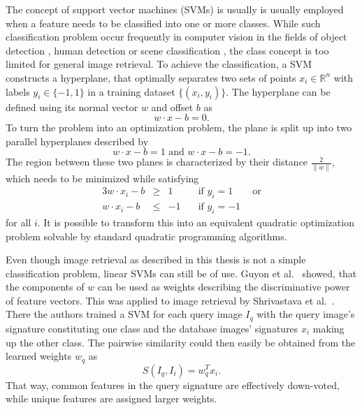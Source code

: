 The concept of support vector machines (SVMs) is usually is usually employed
when a feature needs to be classified into one or more classes. While such
classification problem occur frequently in computer vision in the fields of
object detection \autocite{pontil_support_1998} \autocite{csurka_visual_2004},
human detection \autocite{dalal_histograms_2005} or scene classification
\autocite{yang_evaluating_2007}, the class concept is too limited for general
image retrieval. To achieve the classification, a SVM constructs a hyperplane,
that optimally separates two sets of points $x_i \in \mathbb{R}^n$ with labels
$y_i \in \{-1, 1 \}$ in a training dataset $\{ (x_i, y_i) \}$. The hyperplane
can be defined using its normal vector $w$ and offset $b$ as
\begin{equation*}
    w \cdot x - b = 0.
\end{equation*}
To turn the problem into an optimization problem, the plane is split up into
two parallel hyperplanes described by
\begin{equation*}
    w \cdot x - b = 1 \text{ and } w \cdot x - b = -1.
\end{equation*}
The region between these two planes is characterized by their distance
$\frac{2}{\| w \|}$, which needs to be minimized while satisfying
\begin{alignat*}{3}
    w \cdot x_i - b & \geq & 1 & \quad \text{if } y_i = 1 \qquad \text{or} \\
    w \cdot x_i - b & \leq & -1 & \quad \text{if } y_i = -1
\end{alignat*}
for all $i$. It is possible to transform this into an equivalent quadratic
optimization problem solvable by standard quadratic programming algorithms.

Even though image retrieval as described in this thesis is not a simple
classification problem, linear SVMs can still be of use. Guyon et al.\
\autocite{guyon_gene_2002} showed, that the components of $w$ can be used as
weights describing the discriminative power of feature vectors. This was
applied to image retrieval by Shrivastava et al.\ 
\autocite{shrivastava_data-driven_2011}. There the authors trained a SVM for
each query image $I_q$ with the query image's signature constituting one class
and the database images' signatures $x_i$ making up the other class. The
pairwise similarity could then easily be obtained from the learned weights
$w_q$ as
\begin{equation*}
    S(I_q, I_i) = w_q^T x_i.
\end{equation*}
That way, common features in the query signature are effectively down-voted,
while unique features are assigned larger weights.


